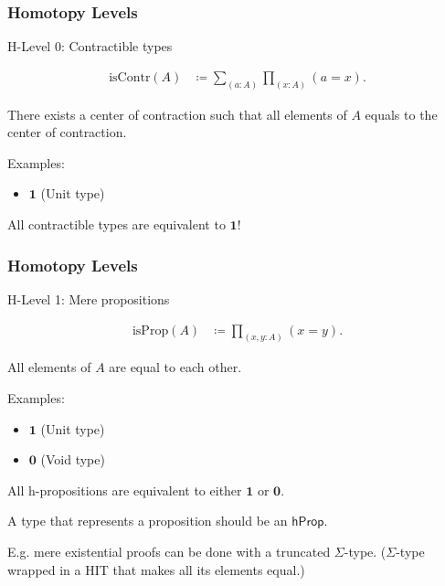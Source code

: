 \documentclass{beamer}
\begin{document}
\begin{frame}
\frametitle{Homotopy Levels}

H-Level 0: Contractible types

\begin{align*}
  \text{isContr}(A) & \coloneqq \sum_{(a:A)} \prod_{(x:A)} (a = x).
\end{align*}

There exists a center of contraction such that all elements of $A$ equals to
the center of contraction.

Examples:
\begin{itemize}
  \item $\mathbf{1}$ (Unit type)
\end{itemize}

All contractible types are equivalent to $\mathbf{1}$!

\end{frame}

\begin{frame}
\frametitle{Homotopy Levels}

H-Level 1: Mere propositions

\begin{align*}
  \text{isProp}(A) & \coloneqq \prod_{(x,y:A)} (x = y).
\end{align*}

All elements of $A$ are equal to each other.

Examples:
\begin{itemize}
  \item $\mathbf{1}$ (Unit type)
  \item $\mathbf{0}$ (Void type)
\end{itemize}

All h-propositions are equivalent to either $\mathbf{1}$ or $\mathbf{0}$.

A type that represents a proposition should be an $\mathsf{hProp}$.

E.g. mere existential proofs can be done with a truncated $\Sigma$-type.
($\Sigma$-type wrapped in a HIT that makes all its elements equal.)

\end{frame}
\end{document}
